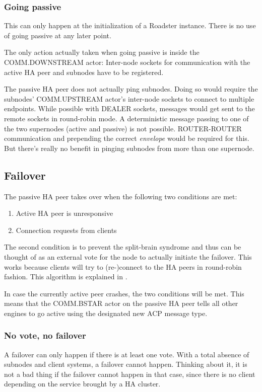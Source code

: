 \subsubsection{Going passive}\label{sec:approach:ha:going-passive}
This can only happen at the initialization of a Roadster instance. There is no
use of going passive at any later point.

The only action actually taken when
going passive is inside the COMM.DOWNSTREAM actor: Inter-node sockets for
communication with the active HA peer and subnodes have to be registered.

The passive HA peer does not actually ping subnodes. Doing so would require the
subnodes' COMM.UPSTREAM actor's inter-node sockets to connect to multiple
endpoints. While possible with DEALER sockets, messages would get sent to the
remote sockets in round-robin mode. A deterministic message passing to one of
the two supernodes (active and passive) is not possible. ROUTER-ROUTER
communication and prepending the correct \emph{envelope} would be required for
this. But there's really no benefit in pinging subnodes from more than one
supernode.


\subsection{Failover}
The passive HA peer takes over when the following two conditions are met:

\begin{enumerate}
\item Active HA peer is unresponsive
\item Connection requests from clients
\end{enumerate}

The second condition is to prevent the split-brain syndrome and thus can be
thought of as an external vote for the node to actually initiate the failover.
This works because clients will try to (re-)connect to the HA peers in
round-robin fashion.  This algorithm is explained in \cite[Chapter 4 - Reliable
Request-Reply Patterns, Client-Side Reliability (Lazy Pirate
Pattern)]{zmq:zguide}.

In case the currently active peer crashes, the two conditions will be met.
This means that the COMM.BSTAR actor on the passive HA peer tells all other
engines to go active using the designated new \gls{ACP} message type.


\subsubsection{No vote, no failover}
A failover can only happen if there is at least one vote. With a total absence
of subnodes and client systems, a failover cannot happen. Thinking about it, it
is not a bad thing if the failover cannot happen in that case, since there is
no client depending on the service brought by a HA cluster.

